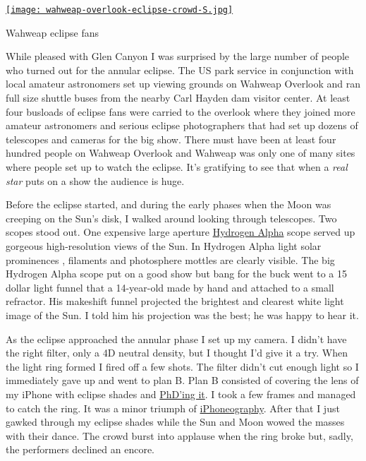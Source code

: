 \begin{floatingfigure}[l]{0.33\textwidth}
\centering
\href{http://conceptcontrol.smugmug.com/Trips/USA-and-Canada/Arizona-Toodling-1/7475075\_MrjqMc}{\texttt{[image: wahweap-overlook-eclipse-crowd-S.jpg]}}
\caption{Wahweap eclipse fans}
\label{fig:2818X1}
\end{floatingfigure}While pleased with Glen Canyon I was surprised by the large number of
people who turned out for the annular eclipse. The US park service in
conjunction with local amateur astronomers set up viewing grounds on
Wahweap Overlook and ran full size shuttle buses from the nearby Carl
Hayden dam visitor center. At least four busloads of eclipse fans were
carried to the overlook where they joined more amateur astronomers and
serious eclipse photographers that had set up dozens of telescopes and
cameras for the big show. There must have been at least four hundred
people on Wahweap Overlook and Wahweap was only one of many sites where
people set up to watch the eclipse. It's gratifying to see that when a
\emph{real star} puts on a show the audience is huge.

Before the eclipse started, and during the early phases when the Moon
was creeping on the Sun's disk, I walked around looking through
telescopes. Two scopes stood out. One expensive large aperture
\href{http://www.astronomyknowhow.com/hydrogen-alpha.htm}{Hydrogen
Alpha} scope served up gorgeous high-resolution views of the Sun. In
Hydrogen Alpha light solar prominences , filaments and photosphere
mottles are clearly visible. The big Hydrogen Alpha scope put on a good
show but bang for the buck went to a 15 dollar light funnel that a
14-year-old made by hand and attached to a small refractor. His
makeshift funnel projected the brightest and clearest white light image
of the Sun. I told him his projection was the best; he was happy to hear
it.




As the eclipse approached the annular phase I set up my camera. I didn't
have the right filter, only a 4D neutral density, but I thought I'd give
it a try. When the light ring formed I fired off a few shots. The filter
didn't cut enough light so I immediately gave up and went to plan B.
Plan B consisted of covering the lens of my iPhone with eclipse shades
and
\href{http://bakerjd99.wordpress.com/2011/12/04/revenge-of-the-phd-camera/}{PhD'ing
it}. I took a few frames and managed to catch the ring. It was a minor
triumph of \href{http://www.iphoneography.com/}{iPhoneography}. After
that I just gawked through my eclipse shades while the Sun and Moon
wowed the masses with their dance. The crowd burst into applause when
the ring broke but, sadly, the performers declined an encore.


